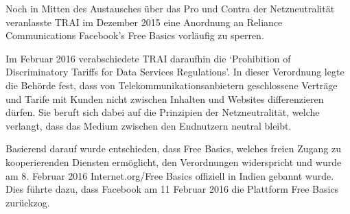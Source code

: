 \documentclass{article}
\begin{document}



Noch in Mitten des Austausches über das Pro und Contra der Netzneutralität veranlasste TRAI im Dezember 2015 eine Anordnung an Reliance Communications Facebook's Free Basics vorläufig zu sperren.
\autocite{Internet governance as 'ideology in practice' - India's 'Free Basics' controversy}

Im Februar 2016 verabschiedete TRAI daraufhin die `Prohibition of Discriminatory Tariffs for Data Services Regulations'.
In dieser Verordnung legte die Behörde fest, dass von Telekommunikationsanbietern geschlossene Verträge und Tarife mit Kunden nicht zwischen Inhalten und Websites differenzieren dürfen. Sie beruft sich dabei auf die Prinzipien der Netzneutralität, welche verlangt, dass das Medium zwischen den Endnutzern neutral bleibt.

Basierend darauf wurde entschieden, dass Free Basics, welches freien Zugang zu kooperierenden Diensten ermöglicht, den
Verordnungen widerspricht und wurde am 8. Februar 2016 Internet.org/Free Basics offiziell in Indien gebannt wurde.
Dies führte dazu, dass Facebook am 11 Februar 2016 die Plattform Free Basics zurückzog.

\end{document}
